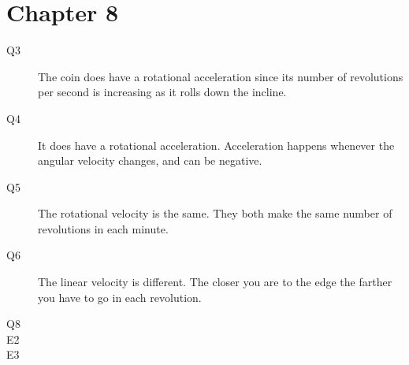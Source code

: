\documentclass{exam}
\begin{document}
\section{Chapter 8}
\begin{description}

\item[Q3]
The coin does have a rotational acceleration since its number of revolutions per second is increasing as it rolls down the incline.

\item[Q4]
It does have a rotational acceleration.  Acceleration happens whenever the angular velocity changes, and can be negative.

\item[Q5]
The rotational velocity is the same.  They both make the same number of revolutions in each minute.

\item[Q6]
The linear velocity is different.  The closer you are to the edge the farther you have to go in each revolution.

\item[Q8]

\item[E2]
\begin{description*}

\item[a]
\[
  \frac{45 \cancel{\text{ rev}}}{1 \cancel{\text{ m}}} \cdot \frac{1 \cancel{\text{ m}}}{60 \text{ s}} = 0.75 \text{ rev/s}
\]

\item[b]
\[
  0.75 \text{ rev/s} \cdot 5 \text{ s} = 3.75 \text{ rev}
\]

\end{description*}

\item[E3]
\begin{description*}


\end{description*}
\end{description}
\end{document}
